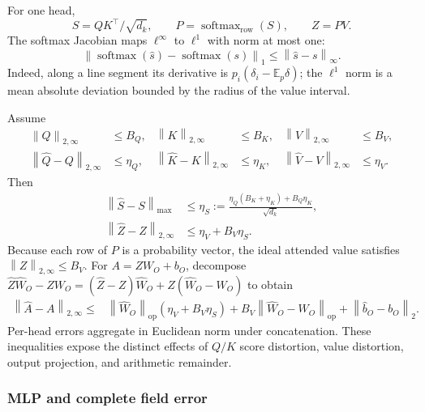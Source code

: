 \documentclass[twoside,11pt]{article}
\newcommand{\norm}[1]{\left\lVert #1\right\rVert}
\begin{document}
For one head,
\begin{equation}
 S=QK^\top/\sqrt{d_k},
 \qquad
 P=\operatorname{softmax}_{\mathrm{row}}(S),
 \qquad
 Z=PV.
 \label{eq:attention-definition-main}
\end{equation}
The softmax Jacobian maps $\ell^\infty$ to $\ell^1$ with norm at most one:
\begin{equation}
 \norm{\operatorname{softmax}(\widehat s)
       -\operatorname{softmax}(s)}_1
 \le\norm{\widehat s-s}_\infty.
 \label{eq:softmax-lipschitz-main}
\end{equation}
Indeed, along a line segment its derivative is $p_i(\delta_i-\mathbb E_p\delta)$; the $\ell^1$ norm is a mean absolute deviation bounded by the radius of the value interval.

Assume
\begin{align*}
 \norm Q_{2,\infty}&\le B_Q,&
 \norm K_{2,\infty}&\le B_K,&
 \norm V_{2,\infty}&\le B_V,\\
 \norm{\widehat Q-Q}_{2,\infty}&\le\eta_Q,&
 \norm{\widehat K-K}_{2,\infty}&\le\eta_K,&
 \norm{\widehat V-V}_{2,\infty}&\le\eta_V.
\end{align*}
Then
\begin{align}
 \norm{\widehat S-S}_{\max}
 &\le\eta_S
 :=\frac{\eta_Q(B_K+\eta_K)+B_Q\eta_K}{\sqrt{d_k}},
 \label{eq:attention-score-error-main}\\
 \norm{\widehat Z-Z}_{2,\infty}
 &\le\eta_V+B_V\eta_S.
 \label{eq:attention-value-error-main}
\end{align}
Because each row of $P$ is a probability vector, the ideal attended value satisfies $\norm Z_{2,\infty}\le B_V$.  For $A=ZW_O+b_O$, decompose $\widehat Z\widehat W_O-ZW_O=(\widehat Z-Z)\widehat W_O+Z(\widehat W_O-W_O)$ to obtain
\begin{align}
 \norm{\widehat A-A}_{2,\infty}
 \le{}&\norm{\widehat W_O}_{\mathrm{op}}
        (\eta_V+B_V\eta_S)
 +B_V\norm{\widehat W_O-W_O}_{\mathrm{op}}
 +\norm{\widehat b_O-b_O}_2.
 \label{eq:attention-output-error-main}
\end{align}
Per-head errors aggregate in Euclidean norm under concatenation.  These inequalities expose the distinct effects of $Q/K$ score distortion, value distortion, output projection, and arithmetic remainder.

\subsubsection{MLP and complete field error}
\end{document}
